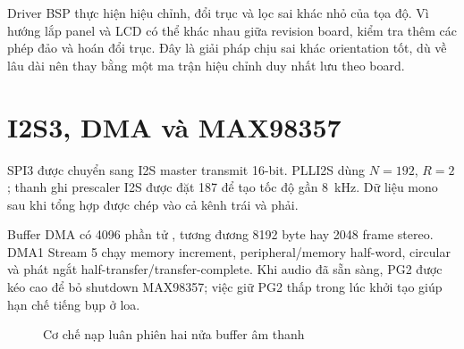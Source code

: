 Driver BSP thực hiện hiệu chỉnh, đổi trục và lọc sai khác nhỏ của tọa độ. Vì hướng lắp panel và LCD có thể khác nhau giữa revision board,  kiểm tra thêm các phép đảo và hoán đổi trục. Đây là giải pháp chịu sai khác orientation tốt, dù về lâu dài nên thay bằng một ma trận hiệu chỉnh duy nhất lưu theo board.

\section{I2S3, DMA và MAX98357}

SPI3 được chuyển sang I2S master transmit 16-bit. PLLI2S dùng $N=192$, $R=2$; thanh ghi prescaler I2S được đặt 187 để tạo tốc độ gần \SI{8}{\kilo\hertz}. Dữ liệu mono sau khi tổng hợp được chép vào cả kênh trái và phải.

Buffer DMA có 4096 phần tử , tương đương 8192 byte hay 2048 frame stereo. DMA1 Stream 5 chạy memory increment, peripheral/memory half-word, circular và phát ngắt half-transfer/transfer-complete. Khi audio đã sẵn sàng, PG2 được kéo cao để bỏ shutdown MAX98357; việc giữ PG2 thấp trong lúc khởi tạo giúp hạn chế tiếng bụp ở loa.

\begin{figure}[H]
  \centering
  \caption{Cơ chế nạp luân phiên hai nửa buffer âm thanh}
  \label{fig:audio-pingpong}
\end{figure}
